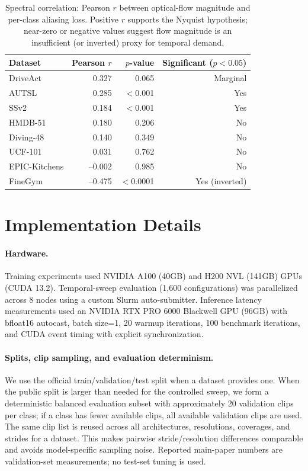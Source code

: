 \documentclass[runningheads]{llncs}
\newcommand{\tabtight}{\setlength{\tabcolsep}{3.5pt}\renewcommand{\arraystretch}{1.12}}
\begin{document}
\begin{table}[!htbp]
\centering
\caption{Spectral correlation: Pearson $r$ between optical-flow magnitude and per-class aliasing loss. Positive $r$ supports the Nyquist hypothesis; near-zero or negative values suggest flow magnitude is an insufficient (or inverted) proxy for temporal demand.}
\label{tab:spectral}
\scriptsize\tabtight
\begin{tabular}{l r r r}
\toprule
Dataset & Pearson $r$ & $p$-value & Significant ($p{<}0.05$) \\
\midrule
DriveAct      & 0.327 & 0.065 & Marginal \\
AUTSL         & 0.285 & $<$0.001 & Yes \\
SSv2          & 0.184 & $<$0.001 & Yes \\
HMDB-51       & 0.180 & 0.206 & No \\
Diving-48     & 0.140 & 0.349 & No \\
UCF-101       & 0.031 & 0.762 & No \\
EPIC-Kitchens & --0.002 & 0.985 & No \\
FineGym       & --0.475 & $<$0.0001 & Yes (inverted) \\
\bottomrule
\end{tabular}
\end{table}

\section{Implementation Details}
\label{sec:sup_impl}

\paragraph{Hardware.}
Training experiments used NVIDIA A100 (40GB) and H200 NVL (141GB) GPUs (CUDA 13.2). Temporal-sweep evaluation (1,600 configurations) was parallelized across 8 nodes using a custom Slurm auto-submitter. Inference latency measurements used an NVIDIA RTX PRO 6000 Blackwell GPU (96GB) with bfloat16 autocast, batch size=1, 20 warmup iterations, 100 benchmark iterations, and CUDA event timing with explicit synchronization.

\paragraph{Splits, clip sampling, and evaluation determinism.}
We use the official train/validation/test split when a dataset provides one. When the public split is larger than needed for the controlled sweep, we form a deterministic balanced evaluation subset with approximately 20 validation clips per class; if a class has fewer available clips, all available validation clips are used. The same clip list is reused across all architectures, resolutions, coverages, and strides for a dataset. This makes pairwise stride/resolution differences comparable and avoids model-specific sampling noise. Reported main-paper numbers are validation-set measurements; no test-set tuning is used.
\end{document}
